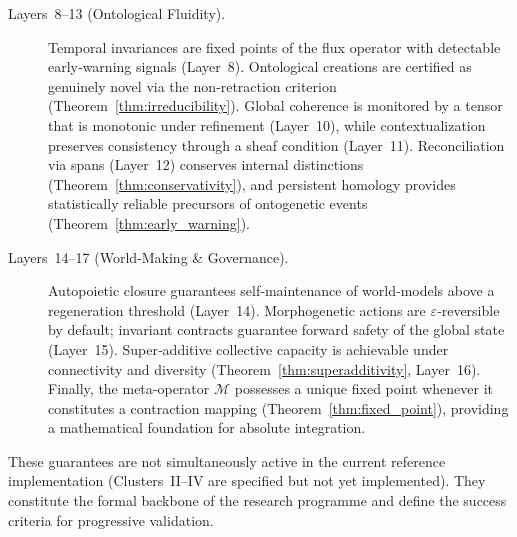 \begin{description}
  \item[Layers~8--13 (Ontological Fluidity).] Temporal invariances are fixed points of the flux operator with detectable early‑warning signals (Layer~8). Ontological creations are certified as genuinely novel via the non‑retraction criterion (Theorem~\ref{thm:irreducibility}). Global coherence is monitored by a tensor that is monotonic under refinement (Layer~10), while contextualization preserves consistency through a sheaf condition (Layer~11). Reconciliation via spans (Layer~12) conserves internal distinctions (Theorem~\ref{thm:conservativity}), and persistent homology provides statistically reliable precursors of ontogenetic events (Theorem~\ref{thm:early_warning}).

  \item[Layers~14--17 (World‑Making \& Governance).] Autopoietic closure guarantees self‑maintenance of world‑models above a regeneration threshold (Layer~14). Morphogenetic actions are $\varepsilon$‑reversible by default; invariant contracts guarantee forward safety of the global state (Layer~15). Super‑additive collective capacity is achievable under connectivity and diversity (Theorem~\ref{thm:superadditivity}, Layer~16). Finally, the meta‑operator $\mathcal{M}$ possesses a unique fixed point whenever it constitutes a contraction mapping (Theorem~\ref{thm:fixed_point}), providing a mathematical foundation for absolute integration.
\end{description}

These guarantees are not simultaneously active in the current reference implementation (Clusters~II–IV are specified but not yet implemented). They constitute the formal backbone of the research programme and define the success criteria for progressive validation.